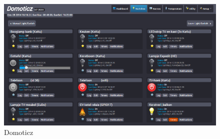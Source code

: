\begin{figure}[h]
  \includegraphics[width=\linewidth]{domoticz.png}
  \caption{Domoticz}
  \label{fig:domoticz}
\end{figure}